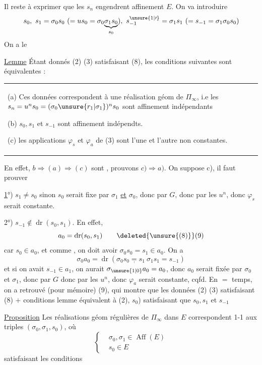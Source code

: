 Il reste à exprimer que les $s_n$ engendrent
affinement $E$. On va introduire
\[ s_0,\ s_1=\sigma_0s_0\ (=us_0=\sigma_0\underset{s_0}{\underbrace{\sigma_1s_0}}),\ s_{-1}^{\unsure{1|\prime}}=\sigma_1s_1\ (=s_{-1}=\sigma_1\sigma_0s_0) \]
On a le

\uline{Lemme} Étant donnés (2) (3) satisfaisant (8),
les conditions suivantes sont équivalentes :

\begin{tabular}{|p{.91\linewidth}}(a) Ces données correspondent à une réalisation
géom de $\Pi_\infty$, i.e les $s_n=u^n s_0=(\sigma_0\unsure{r_1|\sigma_1})^n s_0$
sont affinement indépendants

(b) $s_0,s_1$ et $s_{-1}$ sont affinement indépendts.

(c) les applications $\varphi_s$ et $\varphi_a$ de (3) sont
l'une et l'autre non constantes.\end{tabular}

En effet, $b\Rightarrow(a)\Rightarrow(c)$ sont , prouvons
$c)\Rightarrow a)$. On suppose c), il faut prouver

\uline{1}°) $s_1\ne s_0$ sinon $s_0$ serait fixe par $\sigma_1$ \uline{et} $\sigma_0$,
donc par $G$, donc par les $u^n$, donc $\varphi_s$ serait
constante.

2°) $s_{-1}\notin\operatorname{dr}(s_0,s_1)$. En effet, 
\[ a_0=\operatorname{dr}(s_0,s_1) \tag*{\deleted{\unsure{(8)}}(9)} \]
car $s_0\in a_0$, et comme  , on doit
avoir $\sigma_0s_0=s_1\in a_0$.  On a
\[ \sigma_0a_0=\operatorname{dr}(\sigma_0s_0\underset{,}{=}s_1\ \sigma_1s_1=s_{-1}) \]
et si on avait $s_{-1}\in a_1$, on aurait $\sigma_{\unsure{1|0}}a_0=a_0$,
donc $a_0$ serait fixée par $\sigma_0$ et $\sigma_1$, donc par $G$
donc par les $u^n$, donc $\varphi_a$ serait constante, cqfd.
En $=$ temps, on a retrouvé (pour mémoire)
(9), qui montre que les données (2) (3)
satisfaisant (8) $+$ conditions lemme équivalent à
(2),   $s_0$) satisfaisant que $s_0,s_1$ et $s_{-1}$

\uline{Proposition} Les réalisations géom régulières de $\Pi_\infty$
dans $E$ correspondent 1-1 aux triples
$(\sigma_0,\sigma_1,s_0)$, où
\[ \left\{\begin{aligned} &\sigma_0,\sigma_1\in\operatorname{Aff}(E)\\
&s_0\in E\end{aligned}\right. \tag*{10)} \]
satisfaisant les conditions

